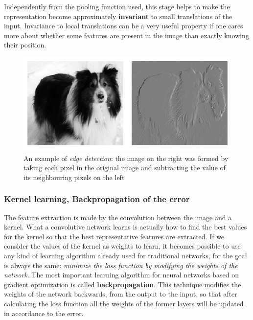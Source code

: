 \documentclass[11pt,a4paper,titlepage]{book}
\begin{document}
Independently from the pooling function used, this stage helps to make the representation become approximately \textbf{invariant} to small translations of the input. Invariance to local translations can be a very useful property if one cares more about whether some features are present in the image than exactly knowing their position.
\begin{figure}[ht]
    \includegraphics[scale=0.5]{imgs/ch_1/feature_map.png}
    \centering
    \caption{An example of \textit{edge detection}: the image on the right was formed by taking each pixel in the original image and subtracting the value of its neighbouring pixels on the left}
    \label{feature_map}
\end{figure}

\subsubsection{Kernel learning, Backpropagation of the error}
The feature extraction is made by the convolution between the image and a kernel. What a convolutive network learns is actually how to find the best values for the kernel so that the best representative features are extracted.
\newline
\newline
If we consider the values of the kernel as weights to learn, it becomes possible to use any kind of learning algorithm already used for traditional networks, for the goal is always the same: \textit{minimize the loss function by modifying the weights of the network}.
\newline
\newline
The most important learning algorithm for neural networks based on gradient optimization is called \textbf{backpropagation}. This technique modifies the weights of the network backwards, from the output to the input, so that after calculating the loss function all the weights of the former layers will be updated in accordance to the error.
\end{document}
